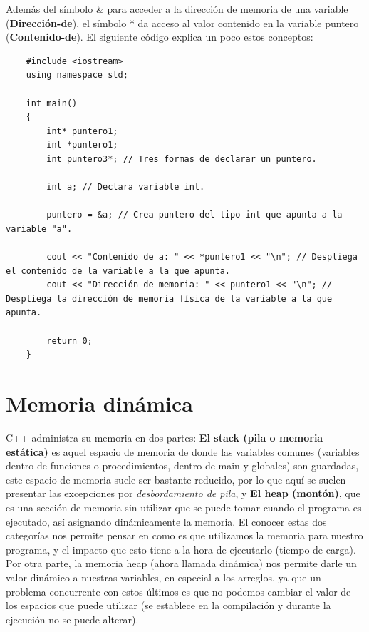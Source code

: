 Además del símbolo \& para acceder a la dirección de memoria de una variable (\textbf{Dirección-de}), el símbolo * da acceso al valor contenido en la variable puntero (\textbf{Contenido-de}). El siguiente código explica un poco estos conceptos:
\begin{lstlisting}
    #include <iostream>
    using namespace std;
    
    int main()
    {
        int* puntero1;
        int *puntero1;
        int puntero3*; // Tres formas de declarar un puntero.
    
        int a; // Declara variable int.
    
        puntero = &a; // Crea puntero del tipo int que apunta a la variable "a".
    
        cout << "Contenido de a: " << *puntero1 << "\n"; // Despliega el contenido de la variable a la que apunta.
        cout << "Dirección de memoria: " << puntero1 << "\n"; // Despliega la dirección de memoria física de la variable a la que apunta.
        
        return 0;
    }
\end{lstlisting}



\section{Memoria dinámica}
\hspace{0.55cm}C++ administra su memoria en dos partes: \textbf{El stack (pila o memoria estática)} es aquel espacio de memoria de donde las variables comunes (variables dentro de funciones o procedimientos, dentro de main y globales) son guardadas, este espacio de memoria suele ser bastante reducido, por lo que aquí se suelen presentar las excepciones por \textit{desbordamiento de pila}, y \textbf{El heap (montón)}, que es una sección de memoria sin utilizar que se puede tomar cuando el programa es ejecutado, así asignando dinámicamente la memoria. El conocer estas dos categorías nos permite pensar en como es que utilizamos la memoria para nuestro programa, y el impacto que esto tiene a la hora de ejecutarlo (tiempo de carga). Por otra parte, la memoria heap (ahora llamada dinámica) nos permite darle un valor dinámico a nuestras variables, en especial a los arreglos, ya que un problema concurrente con estos últimos es que no podemos cambiar el valor de los espacios que puede utilizar (se establece en la compilación y durante la ejecución no se puede alterar).

